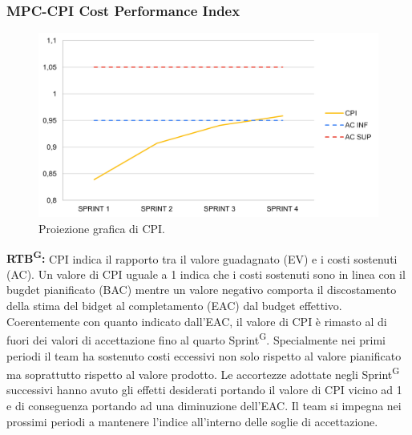 \documentclass[8pt]{article}
\newcommand{\glossterm}[1]{#1\textsuperscript{G}} %
\begin{document}
\subsubsection{MPC-CPI Cost Performance Index}
\begin{figure}[h!]
    \centering
    \includegraphics[width=1\textwidth]{images/CPI.png}
    \caption{Proiezione grafica di CPI.}
    \label{fig:Proiezione grafica di CPI}
\end{figure}
\textbf{\glossterm{RTB}:} CPI indica il rapporto tra il valore guadagnato (EV) e i costi sostenuti (AC). Un valore di CPI uguale a 1 indica che i costi sostenuti sono in linea con il bugdet pianificato (BAC) mentre un valore negativo comporta il discostamento della stima del bidget al completamento (EAC) dal budget effettivo.\\
Coerentemente con quanto indicato dall'EAC, il valore di CPI è rimasto al di fuori dei valori di accettazione fino al quarto \glossterm{Sprint}. Specialmente nei primi periodi il team ha sostenuto costi eccessivi non solo rispetto al valore pianificato ma soprattutto rispetto al valore prodotto. Le accortezze adottate negli \glossterm{Sprint} successivi hanno avuto gli effetti desiderati portando il valore di CPI vicino ad 1 e di conseguenza portando ad una diminuzione dell'EAC. Il team si impegna nei prossimi periodi a mantenere l'indice all'interno delle soglie di accettazione.  
\clearpage
\end{document}
